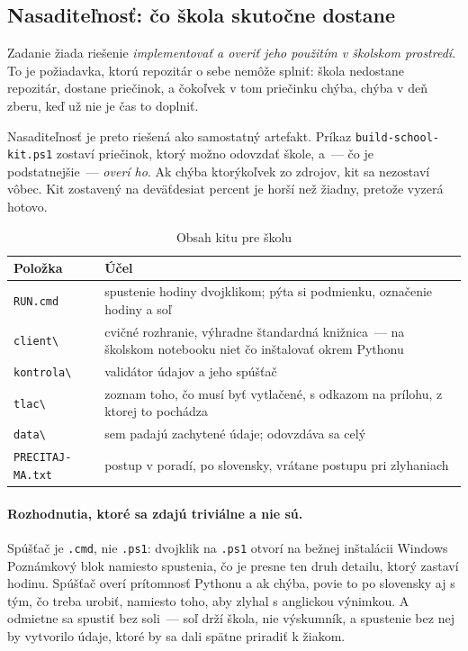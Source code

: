 \subsection{Nasaditeľnosť: čo škola skutočne dostane}
\label{sec:nasaditelnost}

Zadanie žiada riešenie \emph{implementovať a overiť jeho použitím v školskom prostredí}. To je požiadavka, ktorú repozitár o sebe nemôže splniť: škola nedostane repozitár, dostane priečinok, a čokoľvek v tom priečinku chýba, chýba v deň zberu, keď už nie je čas to doplniť.

Nasaditeľnosť je preto riešená ako samostatný artefakt. Príkaz \texttt{build-school-kit.ps1} zostaví priečinok, ktorý možno odovzdať škole, a~--- čo je podstatnejšie~--- \emph{overí ho}. Ak chýba ktorýkoľvek zo zdrojov, kit sa nezostaví vôbec. Kit zostavený na deväťdesiat percent je horší než žiadny, pretože vyzerá hotovo.

\begin{table}[H]
\centering
\caption{Obsah kitu pre školu}
\label{tab:kit}
\small
\begin{tabularx}{\textwidth}{@{}l X@{}}
\toprule
\textbf{Položka} & \textbf{Účel} \\
\midrule
\texttt{RUN.cmd} & spustenie hodiny dvojklikom; pýta si podmienku, označenie hodiny a soľ \\
\texttt{client\textbackslash} & cvičné rozhranie, výhradne štandardná knižnica~--- na školskom notebooku niet čo inštalovať okrem Pythonu \\
\texttt{kontrola\textbackslash} & validátor údajov a jeho spúšťač \\
\texttt{tlac\textbackslash} & zoznam toho, čo musí byť vytlačené, s odkazom na prílohu, z ktorej to pochádza \\
\texttt{data\textbackslash} & sem padajú zachytené údaje; odovzdáva sa celý \\
\texttt{PRECITAJ-MA.txt} & postup v poradí, po slovensky, vrátane postupu pri zlyhaniach \\
\bottomrule
\end{tabularx}
\end{table}

\paragraph{Rozhodnutia, ktoré sa zdajú triviálne a nie sú.} Spúšťač je \texttt{.cmd}, nie \texttt{.ps1}: dvojklik na \texttt{.ps1} otvorí na bežnej inštalácii Windows Poznámkový blok namiesto spustenia, čo je presne ten druh detailu, ktorý zastaví hodinu. Spúšťač overí prítomnosť Pythonu a ak chýba, povie to po slovensky aj s tým, čo treba urobiť, namiesto toho, aby zlyhal s anglickou výnimkou. A odmietne sa spustiť bez soli~--- soľ drží škola, nie výskumník, a spustenie bez nej by vytvorilo údaje, ktoré by sa dali spätne priradiť k žiakom.

